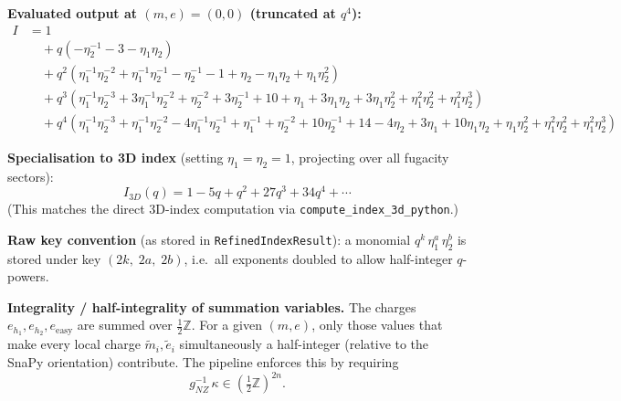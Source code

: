 \documentclass[12pt]{article}
\begin{document}
\textbf{Evaluated output at $(m, e) = (0, 0)$ (truncated at $q^4$):}
\begin{align*}
I &= 1 \\
&\quad + q\!\left(-\eta_2^{-1} - 3 - \eta_1\eta_2\right) \\
&\quad + q^2\!\left(\eta_1^{-1}\eta_2^{-2} + \eta_1^{-1}\eta_2^{-1}
                   - \eta_2^{-1} - 1 + \eta_2 - \eta_1\eta_2 + \eta_1\eta_2^{2}\right) \\
&\quad + q^3\!\left(\eta_1^{-1}\eta_2^{-3} + 3\eta_1^{-1}\eta_2^{-2} + \eta_2^{-2}
                   + 3\eta_2^{-1} + 10 + \eta_1
                   + 3\eta_1\eta_2 + 3\eta_1\eta_2^{2}
                   + \eta_1^{2}\eta_2^{2} + \eta_1^{2}\eta_2^{3}\right) \\
&\quad + q^4\!\left(\eta_1^{-1}\eta_2^{-3} + \eta_1^{-1}\eta_2^{-2}
                   - 4\eta_1^{-1}\eta_2^{-1} + \eta_1^{-1}
                   + \eta_2^{-2} + 10\eta_2^{-1} + 14 - 4\eta_2
                   + 3\eta_1 + 10\eta_1\eta_2 + \eta_1\eta_2^{2}
                   + \eta_1^{2}\eta_2^{2} + \eta_1^{2}\eta_2^{3}\right)
\end{align*}

\noindent\textbf{Specialisation to 3D index} (setting $\eta_1 = \eta_2 = 1$,
projecting over all fugacity sectors):
\[
I_{3D}(q) = 1 - 5q + q^2 + 27q^3 + 34q^4 + \cdots
\]
(This matches the direct 3D-index computation via \texttt{compute\_index\_3d\_python}.)

\bigskip
\noindent\textbf{Raw key convention} (as stored in \texttt{RefinedIndexResult}):
a monomial $q^k\,\eta_1^a\,\eta_2^b$ is stored under key $(2k,\; 2a,\; 2b)$,
i.e.\ all exponents doubled to allow half-integer $q$-powers.

\bigskip
\noindent\textbf{Integrality / half-integrality of summation variables.}
The charges $e_{h_1}, e_{h_2}, e_{\mathrm{easy}}$ are summed over $\tfrac{1}{2}\mathbb{Z}$.
For a given $(m, e)$, only those values that make every local charge
$\tilde{m}_i, \tilde{e}_i$ simultaneously a half-integer (relative to the
SnaPy orientation) contribute.  The pipeline enforces this by requiring
\[
g_{NZ}^{-1}\,\kappa \in \left(\tfrac{1}{2}\mathbb{Z}\right)^{2n}.
\]
\end{document}
